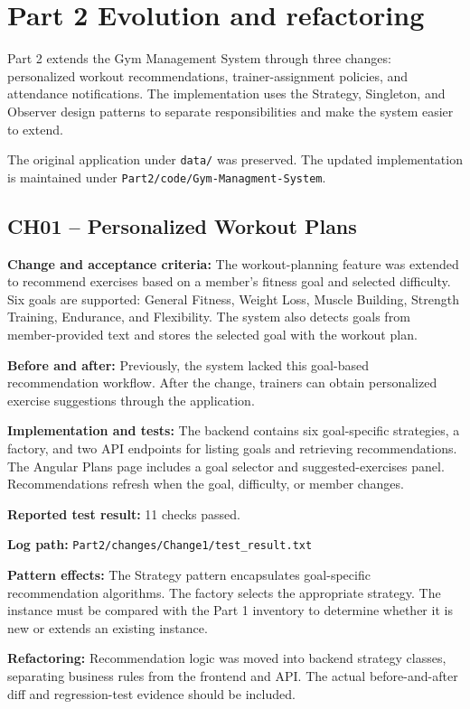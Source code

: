 \documentclass[11pt,a4paper]{article}
\begin{document}
\section{Part 2 Evolution and refactoring}

Part 2 extends the Gym Management System through three changes:
personalized workout recommendations, trainer-assignment policies, and
attendance notifications. The implementation uses the Strategy,
Singleton, and Observer design patterns to separate responsibilities
and make the system easier to extend.

The original application under \texttt{data/} was preserved. The
updated implementation is maintained under
\texttt{Part2/code/Gym-Managment-System}.

\subsection*{CH01 -- Personalized Workout Plans}

\textbf{Change and acceptance criteria:}
The workout-planning feature was extended to recommend exercises based
on a member's fitness goal and selected difficulty. Six goals are
supported: General Fitness, Weight Loss, Muscle Building, Strength
Training, Endurance, and Flexibility. The system also detects goals
from member-provided text and stores the selected goal with the
workout plan.

\textbf{Before and after:}
Previously, the system lacked this goal-based recommendation workflow.
After the change, trainers can obtain personalized exercise suggestions
through the application.

\textbf{Implementation and tests:}
The backend contains six goal-specific strategies, a factory, and two
API endpoints for listing goals and retrieving recommendations. The
Angular Plans page includes a goal selector and suggested-exercises
panel. Recommendations refresh when the goal, difficulty, or member
changes.

\textbf{Reported test result:} 11 checks passed.


\textbf{Log path:}
\texttt{Part2/changes/Change1/test\_result.txt}

\textbf{Pattern effects:}
The Strategy pattern encapsulates goal-specific recommendation
algorithms. The factory selects the appropriate strategy. The instance
must be compared with the Part 1 inventory to determine whether it is
new or extends an existing instance.

\textbf{Refactoring:}
Recommendation logic was moved into backend strategy classes,
separating business rules from the frontend and API. The actual
before-and-after diff and regression-test evidence should be included.
\end{document}
